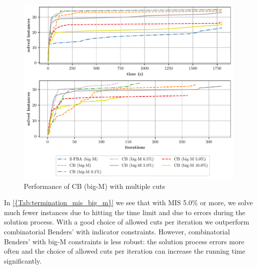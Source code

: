 \begin{figure}[h!]
    \centering
    \includegraphics[width=1.0\textwidth]{Images/mis_comparison_solved_instances_big_m.pdf}
    \caption{Performance of \textsf{CB (big-M)} with multiple cuts}
    \label{fig:mis_comparison_solved_instances_big_m}
\end{figure}

In \cref{{Tab:termination_mis_big_m}} we see that with MIS 5.0\% or more, we solve much fewer instances due to hitting the time limit and due to errors during the solution process. With a good choice of allowed cuts per iteration we outperform combinatorial Benders' with indicator constraints. However, combinatorial Benders' with big-M constraints is less robust: the solution process errors more often and the choice of allowed cuts per iteration can increase the running time significantly.


